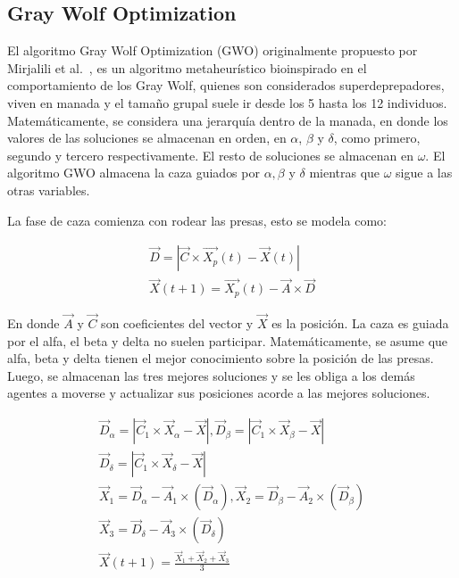 \documentclass[conference]{IEEEtran}
\begin{document}
\subsection{Gray Wolf Optimization}

\noindent El algoritmo Gray Wolf Optimization (GWO) originalmente propuesto por Mirjalili et al.~\cite{Mirjalili2014}, es un algoritmo metaheurístico bioinspirado en el comportamiento de los Gray Wolf, quienes son considerados superdeprepadores, viven en manada y el tamaño grupal suele ir desde los 5 hasta los 12 individuos. Matemáticamente, se considera una jerarquía dentro de la manada, en donde los valores de las soluciones se almacenan en orden, en $\alpha$, $\beta$ y $\delta$, como primero, segundo y tercero respectivamente. El resto de soluciones se almacenan en $\omega$. El algoritmo GWO almacena la caza guiados por $\alpha,\beta$ y $\delta$ mientras que $\omega$ sigue a las otras variables.

\noindent La fase de caza comienza con rodear las presas, esto se modela como:

\begin{equation}
\begin{gathered}
\vec{D} = |\vec{C} \times \vec{X_p}(t)-\vec{X}(t)|\\
\vec{X}(t+1) = \vec{X_p}(t) - \vec{A} \times \vec{D}
\end{gathered}
\label{eq25}
\end{equation}

\noindent En donde $\vec{A}$ y $\vec{C}$ son coeficientes del vector y $\vec{X}$ es la posición. La caza es guiada por el alfa, el beta y delta no suelen participar. Matemáticamente, se asume que alfa, beta y delta tienen el mejor conocimiento sobre la posición de las presas. Luego, se almacenan las tres mejores soluciones y se les obliga a los demás agentes a moverse y actualizar sus posiciones acorde a las mejores soluciones.


\begin{equation}
\begin{gathered}
\vec{D}_{\alpha} = |\vec{C}_1 \times \vec{X}_{\alpha} -\vec{X}|, \vec{D}_{\beta} = |\vec{C}_1 \times \vec{X}_{\beta} -\vec{X}| \\
\vec{D}_{\delta} = |\vec{C}_1 \times \vec{X}_{\delta} -\vec{X}|\\
\vec{X}_1=\vec{D}_{\alpha}-\vec{A}_1 \times (\vec{D}_{\alpha}), \vec{X}_2=\vec{D}_{\beta}-\vec{A}_2 \times (\vec{D}_{\beta})\\
\vec{X}_3=\vec{D}_{\delta}-\vec{A}_3 \times (\vec{D}_{\delta}) \\
\vec{X}(t+1) = \frac{\vec{X}_1+\vec{X}_2+\vec{X}_3}{3}
\end{gathered}
\label{eq26}
\end{equation}
\end{document}
